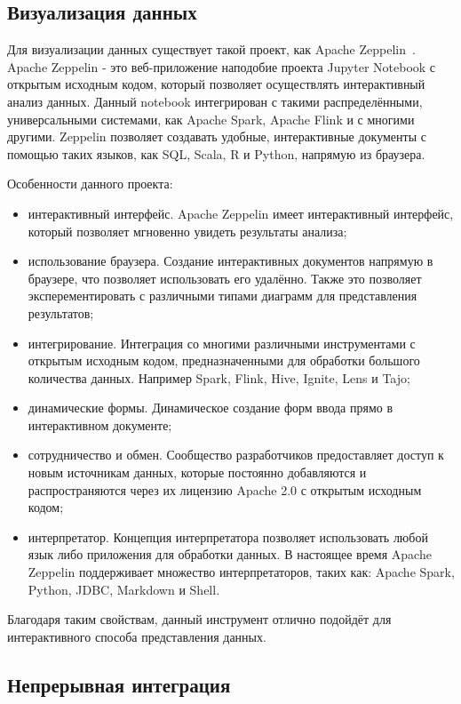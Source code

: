 \subsection{Визуализация данных}

Для визуализации данных существует такой проект, как Apache Zeppelin~\cite{zeppelin_documentation_intro}.
Apache Zeppelin - это веб-приложение наподобие проекта Jupyter Notebook с открытым исходным кодом, который  позволяет осуществлять интерактивный анализ данных.
Данный notebook интегрирован с такими распределёнными, универсальными системами, как Apache Spark, Apache Flink и с многими другими.
Zeppelin позволяет создавать удобные, интерактивные документы с помощью таких языков, как SQL, Scala, R и Python, напрямую из браузера.

Особенности данного проекта:
\begin{itemize}
    \item интерактивный интерфейс. Apache Zeppelin имеет интерактивный интерфейс, который позволяет мгновенно увидеть результаты анализа;
    \item использование браузера. Создание интерактивных документов напрямую в браузере, что позволяет использовать его удалённо. Также это позволяет эксперементировать с различными типами диаграмм для представления результатов;
	\item интегрирование. Интеграция со многими различными инструментами с открытым исходным кодом, предназначенными для обработки большого количества данных. Например Spark, Flink, Hive, Ignite, Lens и Tajo;
	\item динамические формы. Динамическое создание форм ввода прямо в интерактивном документе;
    \item сотрудничество и обмен. Сообщество разработчиков предоставляет доступ к новым источникам данных, которые постоянно добавляются и распространяются через их лицензию Apache 2.0 с открытым исходным кодом;
    \item интерпретатор. Концепция интерпретатора позволяет использовать любой язык либо приложения для обработки данных. В настоящее время Apache Zeppelin поддерживает множество интерпретаторов, таких как: Apache Spark, Python, JDBC, Markdown и Shell.
\end{itemize}

Благодаря таким свойствам, данный инструмент отлично подойдёт для интерактивного способа представления данных.

\subsection{Непрерывная интеграция}

